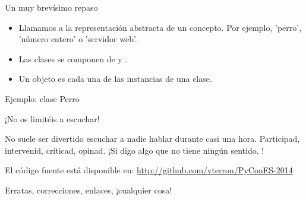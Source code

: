 \begin{frame}{Un muy brevísimo repaso}
  \begin{itemize}
    \item Llamamos  a la representación abstracta de un
      concepto. Por ejemplo, 'perro', 'número entero' o 'servidor web'.
    \item Las clases se componen de  y
      .
    \item Un objeto es cada una de las instancias de una clase.
  \end{itemize}
\end{frame}

\begin{frame}{Ejemplo: clase Perro}
\end{frame}

\begin{frame}{¡No os limitéis a escuchar!}
  \begin{center}
    No suele ser divertido escuchar a nadie hablar durante casi una
    hora. Participad, intervenid, criticad, opinad. ¡Si digo algo que
    no tiene ningún sentido, !
  \end{center}

  \begin{block}{\centering El código fuente está disponible en:}
    \centering \url{http://github.com/vterron/PyConES-2014}
  \end{block}

  \begin{center}
    \small Erratas, correcciones, enlaces, ¡cualquier cosa!
  \end{center}
\end{frame}
